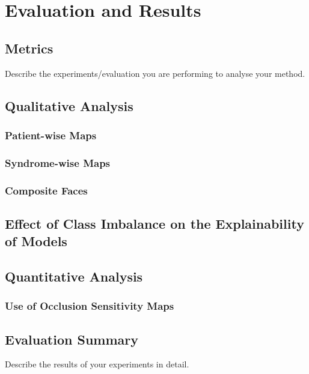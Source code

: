 \documentclass[../report.tex]{subfiles}
\begin{document}
    \chapter{Evaluation and Results}

    \section{Metrics}

    Describe the experiments/evaluation you are performing to analyse your method.

    \section{Qualitative Analysis}
    
    \subsection{Patient-wise Maps}
    
    \subsection{Syndrome-wise Maps}
    
    \subsection{Composite Faces}
    
    \section{Effect of Class Imbalance on the Explainability of Models}

    \section{Quantitative Analysis}
    \subsection{Use of Occlusion Sensitivity Maps}
    \section{Evaluation Summary}

    Describe the results of your experiments in detail.
\end{document}
